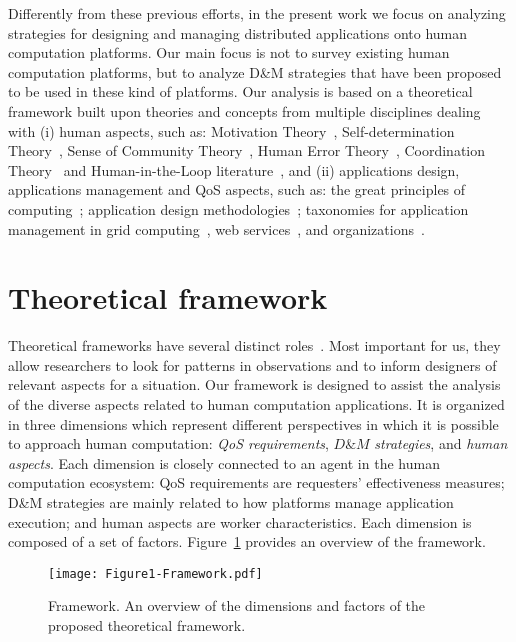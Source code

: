 \documentclass[11pt]{bmc_article_s50}
\begin{document}
Differently from these previous efforts, in the present work we focus on analyzing strategies for designing and managing distributed applications onto human computation platforms. Our main focus is not to survey existing human computation platforms, but to analyze D\&M strategies that have been proposed to be  used in these kind of platforms. Our analysis is based on a theoretical framework built upon theories and concepts from multiple disciplines dealing with (i) human aspects, such as: Motivation Theory~\cite{Maslow:1943}, Self-determination Theory~\cite{Deci:book:1985}, Sense of Community Theory~\cite{mcmillan:JCP:1996}, Human Error Theory~\cite{James:HumanError:1990}, Coordination Theory~\cite{Malone1994} and Human-in-the-Loop literature~\cite{Cranor:UPSEC:2008}, and (ii) applications design, applications management and QoS aspects, such as: the great principles of computing~\cite{Denning2003}; application design methodologies~\cite{Georgakopoulos:1995,Kiepuszewski:2000}; taxonomies for application management in grid computing~\cite{Yu:2005}, web services~\cite{Cardoso:2002}, and organizations~\cite{Kumar:2002}.

\section{Theoretical framework}
\label{sec:arc}

Theoretical frameworks have several distinct roles~\cite{Grudin:2012}. Most important for us, they allow researchers to look for patterns in observations and to inform designers of relevant aspects for a situation. Our framework is designed to assist the analysis of the diverse aspects related to human computation applications. It is organized in three dimensions which represent different perspectives in which it is possible to approach human computation: \textit{QoS requirements}, $D\&M$ \textit{strategies}, and \textit{human aspects}. Each dimension is closely connected to an agent in the human computation ecosystem: QoS requirements are requesters' effectiveness measures; D\&M strategies are mainly related to how platforms manage application execution; and human aspects are worker characteristics. Each dimension is composed of a set of factors. Figure~\ref{fig1} provides an overview of the framework.

\begin{figure}[!h]
\centering
\texttt{[image: Figure1-Framework.pdf]}
\caption{Framework.
An overview of the dimensions and factors of the proposed theoretical framework.}
\label{fig1}
\end{figure}
\end{document}
